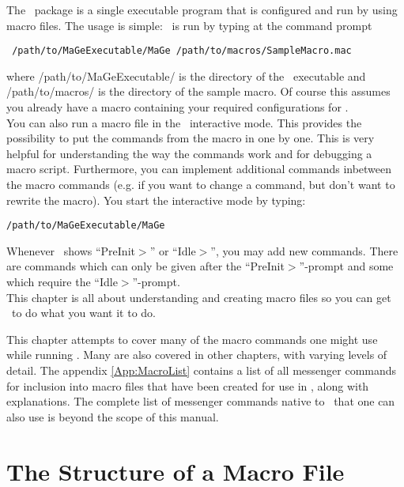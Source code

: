 \label{chapter:MacroCommands}


The \mage \ package is a single executable program that is configured and run by
using macro files.  The usage is simple:  \mage \ is run by typing at the
command prompt 
\begin{lstlisting}
 /path/to/MaGeExecutable/MaGe /path/to/macros/SampleMacro.mac
\end{lstlisting}
\noindent where /path/to/MaGeExecutable/ is the directory of the \mage \
executable and \hbox{/path/to/macros/} is the directory of the sample macro.  Of
course this assumes you already have a macro containing your required
configurations for \mage.\\
You can also run a macro file in the \mage \ interactive mode. 
This provides the possibility to put the commands from the macro in one by one. 
This is very helpful for understanding the way the commands work and for debugging a macro script. 
Furthermore, you can implement additional commands inbetween the macro commands (e.g. if you want to change a command, but don't want to rewrite the macro).
You start the interactive mode by typing:
\begin{lstlisting}
/path/to/MaGeExecutable/MaGe 
\end{lstlisting}
Whenever \mage \ shows ``PreInit$>$'' or ``Idle$>$'', you may add new commands. There are commands which can only be given after the ``PreInit$>$''-prompt and some which require the ``Idle$>$''-prompt.\\

This chapter is all about understanding and creating
macro files so you can get \mage \ to do what you want it to do.


This chapter attempts to cover many of the macro commands one might use while
running \mage. Many are also covered in other chapters, with varying levels of
detail.  The appendix \ref{App:MacroList}
contains a list of all messenger commands for inclusion into macro files that
have been created for use in \mage, along with explanations.  The complete list of
messenger commands native to \geant \ that one can also use is beyond the scope
of this manual.

\section{The Structure of a Macro File}
\label{sec:MacroStructure}

